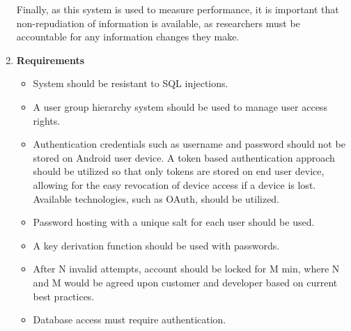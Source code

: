 \documentclass[a4paper,10pt]{article}
\begin{document}
\begin{enumerate}
Finally, as this system is used to measure performance, it is important that non-repudiation of information is available, as researchers must be accountable for any information changes they make.
\item \textbf{Requirements}
	\begin{itemize}
		\item System should be resistant to SQL injections.
		\item A user group hierarchy system should be used to manage user access rights.
		\item Authentication credentials such as username and password should not be stored on Android user device. A token based authentication approach should be utilized so that only tokens are stored on end user device, allowing for the easy revocation of device access if a device is lost. Available technologies, such as OAuth, should be utilized.
		\item Password hosting with a unique salt for each user should be used.
		\item A key derivation function should be used with passwords. 
		\item After N invalid attempts, account should be locked for M min, where N and M would be agreed upon customer and developer based on current best practices.
		\item Database access must require authentication.
	\end{itemize}
\end{enumerate}
\end{document}
